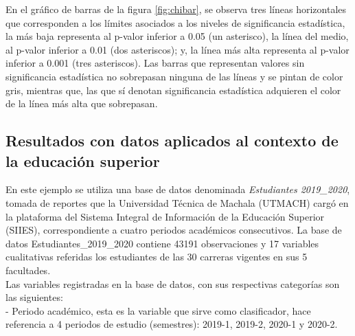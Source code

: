 \documentclass[water,article,submit,moreauthors,pdftex]{mdpi}
\begin{document}
En el gráfico de barras de la figura \ref{fig:chibar}, se observa tres
líneas horizontales que corresponden a los límites asociados a los
niveles de significancia estadística, la más baja representa al p-valor
inferior a 0.05 (un asterisco), la línea del medio, al p-valor inferior
a 0.01 (dos asteriscos); y, la línea más alta representa al p-valor
inferior a 0.001 (tres asteriscos). Las barras que representan valores
sin significancia estadística no sobrepasan ninguna de las líneas y se
pintan de color gris, mientras que, las que sí denotan significancia
estadística adquieren el color de la línea más alta que sobrepasan.

\hypertarget{resultados-con-datos-aplicados-al-contexto-de-la-educaciuxf3n-superior}{%
\subsection{Resultados con datos aplicados al contexto de la educación
superior}\label{resultados-con-datos-aplicados-al-contexto-de-la-educaciuxf3n-superior}}

En este ejemplo se utiliza una base de datos denominada
\emph{Estudiantes 2019\_2020}, tomada de reportes que la Universidad
Técnica de Machala (UTMACH) cargó en la plataforma del Sistema Integral
de Información de la Educación Superior (SIIES), correspondiente a
cuatro periodos académicos consecutivos. La base de datos
Estudiantes\_2019\_2020 contiene 43191 observaciones y 17 variables
cualitativas referidas los estudiantes de las 30 carreras vigentes en
sus 5 facultades.\\
Las variables registradas en la base de datos, con sus respectivas
categorías son las siguientes:\\
- Periodo académico, esta es la variable que sirve como clasificador,
hace referencia a 4 periodos de estudio (semestres): 2019-1, 2019-2,
2020-1 y 2020-2.
\end{document}
